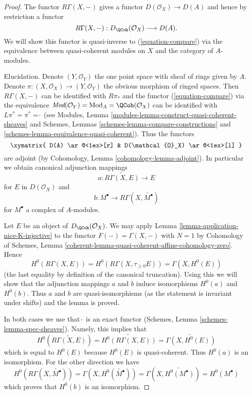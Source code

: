 \begin{proof}
The functor $R\Gamma(X, -)$ gives a functor
$D(\mathcal{O}_X) \to D(A)$ and hence by restriction a functor
\begin{equation}
\label{equation-back}
R\Gamma(X, -) : D_\QCoh(\mathcal{O}_X) \longrightarrow D(A).
\end{equation}
We will show this functor is quasi-inverse to (\ref{equation-compare})
via the equivalence between quasi-coherent modules on $X$ and
the category of $A$-modules.

\medskip\noindent
Elucidation. Denote $(Y, \mathcal{O}_Y)$ the one point space with sheaf
of rings given by $A$. Denote
$\pi : (X, \mathcal{O}_X) \to (Y, \mathcal{O}_Y)$
the obvious morphism of ringed spaces.
Then $R\Gamma(X, -)$ can be identified with $R\pi_*$ and the functor
(\ref{equation-compare}) via the equivalence
$\textit{Mod}(\mathcal{O}_Y) = \text{Mod}_A = \QCoh(\mathcal{O}_X)$
can be identified with $L\pi^* = \pi^* = \widetilde{\ }$ (see
Modules, Lemma \ref{modules-lemma-construct-quasi-coherent-sheaves} and
Schemes, Lemmas \ref{schemes-lemma-compare-constructions} and
\ref{schemes-lemma-equivalence-quasi-coherent}). Thus the functors
$$
\xymatrix{
D(A) \ar@<1ex>[r] & D(\mathcal{O}_X) \ar@<1ex>[l]
}
$$
are adjoint (by Cohomology, Lemma \ref{cohomology-lemma-adjoint}). In
particular we obtain canonical adjunction mappings
$$
a : \widetilde{R\Gamma(X, E)} \longrightarrow E
$$
for $E$ in $D(\mathcal{O}_X)$ and
$$
b : M^\bullet \longrightarrow R\Gamma(X, \widetilde{M^\bullet})
$$
for $M^\bullet$ a complex of $A$-modules.

\medskip\noindent
Let $E$ be an object of $D_\QCoh(\mathcal{O}_X)$. We may apply
Lemma \ref{lemma-application-nice-K-injective}
to the functor $F(-) = \Gamma(X, -)$
with $N = 1$ by Cohomology of Schemes, Lemma
\ref{coherent-lemma-quasi-coherent-affine-cohomology-zero}.
Hence
$$
H^0(R\Gamma(X, E)) = H^0(R\Gamma(X, \tau_{\geq 0}E)) = \Gamma(X, H^0(E))
$$
(the last equality by definition of the canonical truncation).
Using this we will show that the adjunction mappings $a$ and $b$
induce isomorphisms $H^0(a)$ and $H^0(b)$. Thus $a$ and $b$
are quasi-isomorphisms (as the statement is invariant under shifts)
and the lemma is proved.

\medskip\noindent
In both cases we use that $\widetilde{\ }$ is an exact functor
(Schemes, Lemma \ref{schemes-lemma-spec-sheaves}). Namely, this
implies that
$$
H^0\left(\widetilde{R\Gamma(X, E)}\right) =
\widetilde{H^0(R\Gamma(X, E))} =
\widetilde{\Gamma(X, H^0(E))}
$$
which is equal to $H^0(E)$ because $H^0(E)$ is quasi-coherent. Thus
$H^0(a)$ is an isomorphism. For the other direction we have
$$
H^0(R\Gamma(X, \widetilde{M^\bullet})) =
\Gamma(X, H^0(\widetilde{M^\bullet})) =
\Gamma(X, \widetilde{H^0(M^\bullet)}) =
H^0(M^\bullet)
$$
which proves that $H^0(b)$ is an isomorphism.
\end{proof}

